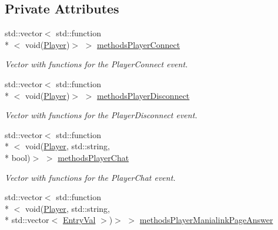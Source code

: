 \subsection*{Private Attributes}
\begin{DoxyCompactItemize}
\item 
\hypertarget{classEventManager_a98c39230b15f7d40fa5d3c87210a5fd9}{std\-::vector$<$ std\-::function\\*
$<$ void(\hyperlink{structPlayer}{Player})$>$ $>$ \hyperlink{classEventManager_a98c39230b15f7d40fa5d3c87210a5fd9}{methods\-Player\-Connect}}\label{classEventManager_a98c39230b15f7d40fa5d3c87210a5fd9}

\begin{DoxyCompactList}\small\item\em Vector with functions for the Player\-Connect event. \end{DoxyCompactList}\item 
\hypertarget{classEventManager_a05df9668a34f0dd3d4a9f049d884aea9}{std\-::vector$<$ std\-::function\\*
$<$ void(\hyperlink{structPlayer}{Player})$>$ $>$ \hyperlink{classEventManager_a05df9668a34f0dd3d4a9f049d884aea9}{methods\-Player\-Disconnect}}\label{classEventManager_a05df9668a34f0dd3d4a9f049d884aea9}

\begin{DoxyCompactList}\small\item\em Vector with functions for the Player\-Disconnect event. \end{DoxyCompactList}\item 
\hypertarget{classEventManager_af3254e563a2246e9298baf23f31b14eb}{std\-::vector$<$ std\-::function\\*
$<$ void(\hyperlink{structPlayer}{Player}, std\-::string, \\*
bool)$>$ $>$ \hyperlink{classEventManager_af3254e563a2246e9298baf23f31b14eb}{methods\-Player\-Chat}}\label{classEventManager_af3254e563a2246e9298baf23f31b14eb}

\begin{DoxyCompactList}\small\item\em Vector with functions for the Player\-Chat event. \end{DoxyCompactList}\item 
\hypertarget{classEventManager_a28d7fbe547c5177f293208ccf4f98fce}{std\-::vector$<$ std\-::function\\*
$<$ void(\hyperlink{structPlayer}{Player}, std\-::string, \\*
std\-::vector$<$ \hyperlink{structEntryVal}{Entry\-Val} $>$)$>$ $>$ \hyperlink{classEventManager_a28d7fbe547c5177f293208ccf4f98fce}{methods\-Player\-Manialink\-Page\-Answer}}\label{classEventManager_a28d7fbe547c5177f293208ccf4f98fce}


\end{DoxyCompactItemize}
